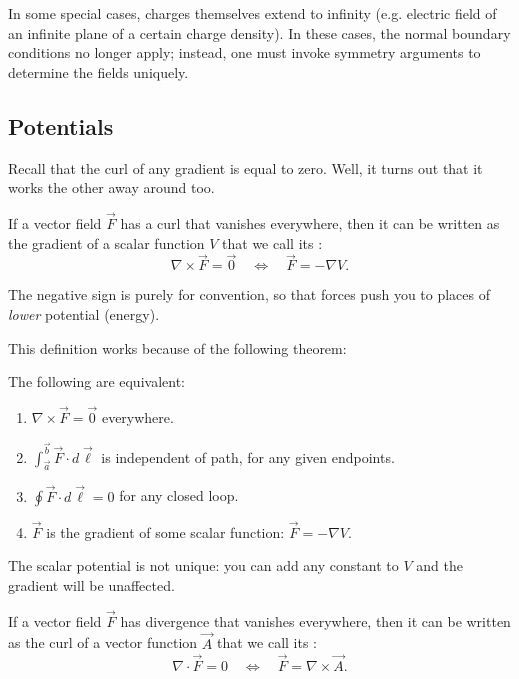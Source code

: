 \begin{remark}
In some special cases, charges themselves extend to infinity (e.g. electric field of an infinite plane of a certain charge density). In these cases, the normal boundary conditions no longer apply; instead, one must invoke symmetry arguments to determine the fields uniquely.
\end{remark}

\subsection{Potentials}

Recall that the curl of any gradient is equal to zero. Well, it turns out that it works the other away around too.

\begin{definition}
If a vector field $\vec{F}$ has a curl that vanishes everywhere, then it can be written as the gradient of a scalar function $V$ that we call its :
\[\nabla\times \vec{F}=\vec{0}\quad\Longleftrightarrow\quad \vec{F}=-\nabla V.\]
\end{definition}

\begin{remark}
The negative sign is purely for convention, so that forces push you to places of \textit{lower} potential (energy).
\end{remark}

This definition works because of the following theorem:

\begin{theorem}
    The following are equivalent:
    \begin{enumerate}[(1)]
        \item $\nabla\times\vec{F}=\vec{0}$ everywhere.
        \item $\int_{\vec{a}}^{\vec{b}}\vec{F}\cdot d\vec{\ell}$ is independent of path, for any given endpoints.
        \item $\oint \vec{F}\cdot d\vec{\ell}=0$ for any closed loop.
        \item $\vec{F}$ is the gradient of some scalar function: $\vec{F}=-\nabla V$.
    \end{enumerate}
\end{theorem}

The scalar potential is not unique: you can add any constant to $V$ and the gradient will be unaffected.

\begin{definition}
If a vector field $\vec{F}$ has divergence that vanishes everywhere, then it can be written as the curl of a vector function $\vec{A}$ that we call its :
\[\nabla\cdot\vec{F}=0\quad\Longleftrightarrow\quad \vec{F}=\nabla\times\vec{A}.\]
\end{definition}

